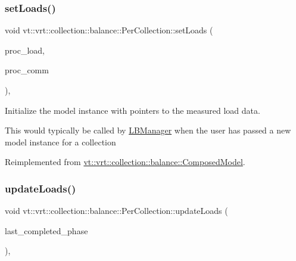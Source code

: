 \subsubsection{\texorpdfstring{set\+Loads()}{setLoads()}}
{\footnotesize\ttfamily void vt\+::vrt\+::collection\+::balance\+::\+Per\+Collection\+::set\+Loads (\begin{DoxyParamCaption}\item[{std\+::unordered\+\_\+map$<$ \hyperlink{namespacevt_a46ce6733d5cdbd735d561b7b4029f6d7}{Phase\+Type}, \hyperlink{namespacevt_1_1vrt_1_1collection_1_1balance_a5339303db2e1ce964d783a53fd74e6b1}{Load\+Map\+Type} $>$ const $\ast$}]{proc\+\_\+load,  }\item[{std\+::unordered\+\_\+map$<$ \hyperlink{namespacevt_a46ce6733d5cdbd735d561b7b4029f6d7}{Phase\+Type}, \hyperlink{namespacevt_1_1vrt_1_1collection_1_1balance_a01ee1fb0ae2da1d2ab7fdca3be9ae351}{Comm\+Map\+Type} $>$ const $\ast$}]{proc\+\_\+comm }\end{DoxyParamCaption})\hspace{0.3cm}{\ttfamily [override]}, {\ttfamily [virtual]}}



Initialize the model instance with pointers to the measured load data. 

This would typically be called by \hyperlink{structvt_1_1vrt_1_1collection_1_1balance_1_1_l_b_manager}{L\+B\+Manager} when the user has passed a new model instance for a collection 

Reimplemented from \hyperlink{classvt_1_1vrt_1_1collection_1_1balance_1_1_composed_model_a3a7da5e81a933ea88f87a1226fd3b401}{vt\+::vrt\+::collection\+::balance\+::\+Composed\+Model}.

\mbox{\label{structvt_1_1vrt_1_1collection_1_1balance_1_1_per_collection_a2b41fbbe2b684654f8dbfd9207b77501}} 
\subsubsection{\texorpdfstring{update\+Loads()}{updateLoads()}}
{\footnotesize\ttfamily void vt\+::vrt\+::collection\+::balance\+::\+Per\+Collection\+::update\+Loads (\begin{DoxyParamCaption}\item[{\hyperlink{namespacevt_a46ce6733d5cdbd735d561b7b4029f6d7}{Phase\+Type}}]{last\+\_\+completed\+\_\+phase }\end{DoxyParamCaption})\hspace{0.3cm}{\ttfamily [override]}, {\ttfamily [virtual]}}




